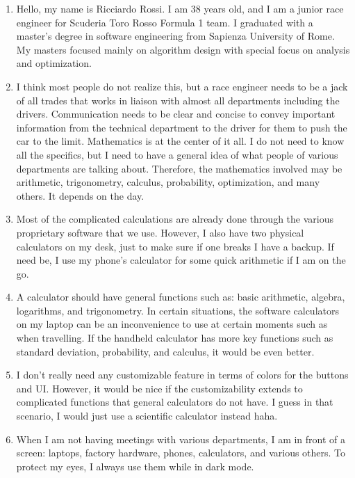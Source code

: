 \documentclass[titlepage]{article}
\begin{document}
\begin{itemize}
                    \begin{enumerate}
                        \item Hello, my name is Ricciardo Rossi. I am 38 years old, and I am a junior race engineer for Scuderia Toro Rosso Formula 1 team. I graduated with a master’s degree in software engineering from Sapienza University of Rome. My masters focused mainly on algorithm design with special focus on analysis and optimization.
                        \item I think most people do not realize this, but a race engineer needs to be a jack of all trades that works in liaison with almost all departments including the drivers. Communication needs to be clear and concise to convey important information from the technical department to the driver for them to push the car to the limit. Mathematics is at the center of it all. I do not need to know all the specifics, but I need to have a general idea of what people of various departments are talking about. Therefore, the mathematics involved may be arithmetic, trigonometry, calculus, probability, optimization, and many others. It depends on the day.
                        \item Most of the complicated calculations are already done through the various proprietary software that we use. However, I also have two physical calculators on my desk, just to make sure if one breaks I have a backup. If need be, I use my phone’s calculator for some quick arithmetic if I am on the go.
                        \item A calculator should have general functions such as: basic arithmetic, algebra, logarithms, and trigonometry. In certain situations, the software calculators on my laptop can be an inconvenience to use at certain moments such as when travelling. If the handheld calculator has more key functions such as standard deviation, probability, and calculus, it would be even better.
                        \item I don’t really need any customizable feature in terms of colors for the buttons and UI. However, it would be nice if the customizability extends to complicated functions that general calculators do not have. I guess in that scenario, I would just use a scientific calculator instead haha.
                        \item When I am not having meetings with various departments, I am in front of a screen:  laptops, factory hardware, phones, calculators, and various others. To protect my eyes, I always use them while in dark mode.

\end{enumerate}
\end{itemize}
\end{document}
